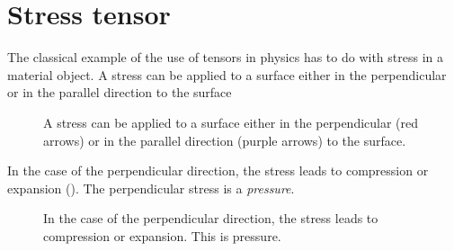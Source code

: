 \section{Stress tensor}

The classical example of the use of tensors in physics has to do with
stress in a material object. A stress can be applied to a surface
either in the perpendicular or in the parallel direction to the
surface 

\begin{figure}
  \begin{center}
  \end{center}
  \caption[]{A stress can be applied to a surface
either in the perpendicular (red arrows) or in the parallel direction
(purple arrows) to the surface.}
  \label{fig:tensor1}
\end{figure}

In the case of the perpendicular direction, the stress leads to
compression or expansion (). The perpendicular stress is a {\it pressure}. 

\begin{figure}
  \begin{center}
  \end{center}
  \caption[]{In the case of the perpendicular direction, the stress leads to
compression or expansion. This is pressure.}
  \label{fig:tensor2}
\end{figure}

